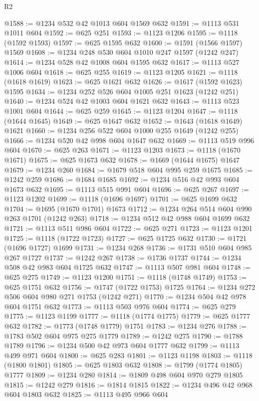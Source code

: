 \begin{lexlean}{R2}
\begin{coremodule}
@1588 := @1234 @532 @42 @1013 @604 @1569 @632
@1591 := @1113 @531 @1011 @604
@1592 := @625 @251
@1593 := @1123 @1206
@1595 := @1118 (@1592 @1593)
@1597 := @625 @1595 @632
@1600 := @1591 (@1566 @1597) @1569
@1608 := @1234 @248 @530 @604 @1010 @247 @1597 (@1242 @247)
@1614 := @1234 @528 @42 @1008 @604 @1595 @632
@1617 := @1113 @527 @1006 @604
@1618 := @625 @255
@1619 := @1123 @1205
@1621 := @1118 (@1618 @1619)
@1623 := @625 @1621 @632
@1626 := @1617 (@1592 @1623) @1595
@1634 := @1234 @252 @526 @604 @1005 @251 @1623 (@1242 @251)
@1640 := @1234 @524 @42 @1003 @604 @1621 @632
@1643 := @1113 @523 @1001 @604
@1644 := @625 @259
@1645 := @1123 @1204
@1647 := @1118 (@1644 @1645)
@1649 := @625 @1647 @632
@1652 := @1643 (@1618 @1649) @1621
@1660 := @1234 @256 @522 @604 @1000 @255 @1649 (@1242 @255)
@1666 := @1234 @520 @42 @998 @604 @1647 @632
@1669 := @1113 @519 @996 @604
@1670 := @625 @263
@1671 := @1123 @1203
@1673 := @1118 (@1670 @1671)
@1675 := @625 @1673 @632
@1678 := @1669 (@1644 @1675) @1647
@1679 := @1234 @260
@1684 := @1679 @518 @604 @995 @259 @1675
@1685 := @1242 @259
@1686 := @1684 @1685
@1692 := @1234 @516 @42 @993 @604 @1673 @632
@1695 := @1113 @515 @991 @604
@1696 := @625 @267
@1697 := @1123 @1202
@1699 := @1118 (@1696 @1697)
@1701 := @625 @1699 @632
@1704 := @1695 (@1670 @1701) @1673
@1712 := @1234 @264 @514 @604 @990 @263 @1701 (@1242 @263)
@1718 := @1234 @512 @42 @988 @604 @1699 @632
@1721 := @1113 @511 @986 @604
@1722 := @625 @271
@1723 := @1123 @1201
@1725 := @1118 (@1722 @1723)
@1727 := @625 @1725 @632
@1730 := @1721 (@1696 @1727) @1699
@1731 := @1234 @268
@1736 := @1731 @510 @604 @985 @267 @1727
@1737 := @1242 @267
@1738 := @1736 @1737
@1744 := @1234 @508 @42 @983 @604 @1725 @632
@1747 := @1113 @507 @981 @604
@1748 := @625 @275
@1749 := @1123 @1200
@1751 := @1118 (@1748 @1749)
@1753 := @625 @1751 @632
@1756 := @1747 (@1722 @1753) @1725
@1764 := @1234 @272 @506 @604 @980 @271 @1753 (@1242 @271)
@1770 := @1234 @504 @42 @978 @604 @1751 @632
@1773 := @1113 @503 @976 @604
@1774 := @625 @279
@1775 := @1123 @1199
@1777 := @1118 (@1774 @1775)
@1779 := @625 @1777 @632
@1782 := @1773 (@1748 @1779) @1751
@1783 := @1234 @276
@1788 := @1783 @502 @604 @975 @275 @1779
@1789 := @1242 @275
@1790 := @1788 @1789
@1796 := @1234 @500 @42 @973 @604 @1777 @632
@1799 := @1113 @499 @971 @604
@1800 := @625 @283
@1801 := @1123 @1198
@1803 := @1118 (@1800 @1801)
@1805 := @625 @1803 @632
@1808 := @1799 (@1774 @1805) @1777
@1809 := @1234 @280
@1814 := @1809 @498 @604 @970 @279 @1805
@1815 := @1242 @279
@1816 := @1814 @1815
@1822 := @1234 @496 @42 @968 @604 @1803 @632
@1825 := @1113 @495 @966 @604

\end{coremodule}
\end{lexlean}
